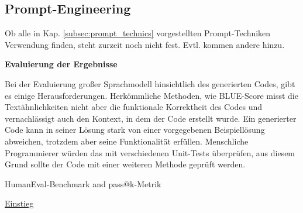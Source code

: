 	



\subsection{Prompt-Engineering}
\begin{tcolorbox}[
	enhanced,
	colback=yellow!5!white,
	colframe=yellow!75!black!50,
	title= Wird noch im Verlauf der Arbeit geändert
	]
	Ob alle in Kap. \ref{subsec:prompt_technics} vorgestellten Prompt-Techniken Verwendung finden, steht zurzeit noch nicht fest. Evtl. kommen andere hinzu.
\end{tcolorbox}

\textbf{Evaluierung der Ergebnisse}\vspace{0.2cm}

Bei der Evaluierung großer Sprachmodell hinsichtlich des generierten Codes, gibt es einige Herausforderungen. Herkömmliche Methoden, wie BLUE-Score misst die Textähnlichkeiten nicht aber die funktionale Korrektheit des Codes und vernachlässigt auch den Kontext, in dem der Code erstellt wurde. Ein generierter Code kann in seiner Lösung stark von einer vorgegebenen Beispiellösung abweichen, trotzdem aber seine Funktionalität erfüllen. Menschliche Programmierer würden das mit verschiedenen Unit-Tests überprüfen, aus diesem Grund sollte der Code mit einer weiteren Methode geprüft werden.\vspace{0.2cm}

HumanEval-Benchmark and pass@k-Metrik

\href{https://deepgram.com/learn/humaneval-llm-benchmark}{Einstieg}

